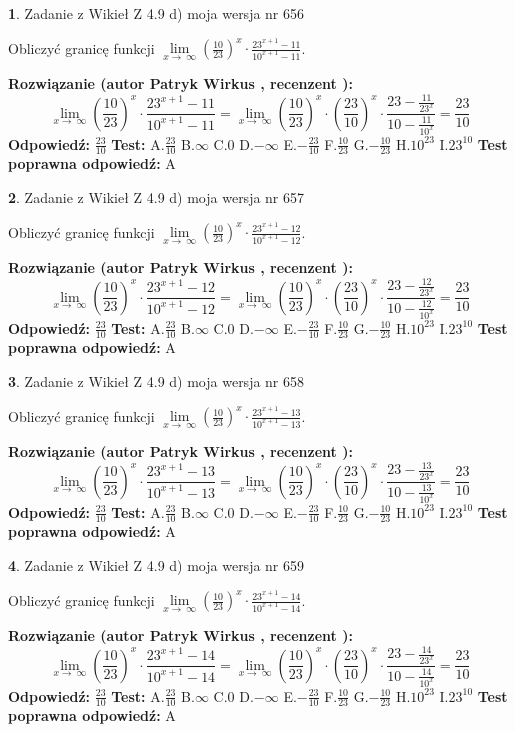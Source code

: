 \documentclass[12pt, a4paper]{article}
\theoremstyle{definition} %
\newtheorem{zad}{}
\newcommand{\zadStart}[1]{\begin{zad}#1\newline}
\newcommand{\zadStop}{\end{zad}}
\newcommand{\rozwStart}[2]{\noindent \textbf{Rozwiązanie (autor #1 , recenzent #2): }\newline}
\newcommand{\rozwStop}{\newline}
\newcommand{\odpStart}{\noindent \textbf{Odpowiedź:}\newline}
\newcommand{\odpStop}{\newline}
\newcommand{\testStart}{\noindent \textbf{Test:}\newline}
\newcommand{\testStop}{\newline}
\newcommand{\kluczStart}{\noindent \textbf{Test poprawna odpowiedź:}\newline}
\newcommand{\kluczStop}{\newline}
\begin{document}
\zadStart{Zadanie z Wikieł Z 4.9 d) moja wersja nr 656}


Obliczyć granicę funkcji  $\lim\limits_{x\to\ \infty}(\frac{10}{23})^{x}\cdot\frac{23^{x+1}-11}{10^{x+1}-11}$.
\zadStop
\rozwStart{Patryk Wirkus}{}
$$\lim\limits_{x\to\ \infty}(\frac{10}{23})^{x}\cdot\frac{23^{x+1}-11}{10^{x+1}-11}=\lim\limits_{x\to\ \infty}(\frac{10}{23})^{x}\cdot(\frac{23}{10})^{x} \cdot \frac{23-\frac{11}{23^{x}}}{10-\frac{11}{10^{x}}} = \frac{23}{10}$$
\rozwStop
\odpStart
$\frac{23}{10}$
\odpStop
\testStart
A.$\frac{23}{10}$ B.$\infty$ C.$0$ D.$-\infty$ E.$-\frac{23}{10}$
F.$\frac{10}{23}$ G.$-\frac{10}{23}$
H.$10^{23}$
I.$23^{10}$
\testStop
\kluczStart
A
\kluczStop



\zadStart{Zadanie z Wikieł Z 4.9 d) moja wersja nr 657}


Obliczyć granicę funkcji  $\lim\limits_{x\to\ \infty}(\frac{10}{23})^{x}\cdot\frac{23^{x+1}-12}{10^{x+1}-12}$.
\zadStop
\rozwStart{Patryk Wirkus}{}
$$\lim\limits_{x\to\ \infty}(\frac{10}{23})^{x}\cdot\frac{23^{x+1}-12}{10^{x+1}-12}=\lim\limits_{x\to\ \infty}(\frac{10}{23})^{x}\cdot(\frac{23}{10})^{x} \cdot \frac{23-\frac{12}{23^{x}}}{10-\frac{12}{10^{x}}} = \frac{23}{10}$$
\rozwStop
\odpStart
$\frac{23}{10}$
\odpStop
\testStart
A.$\frac{23}{10}$ B.$\infty$ C.$0$ D.$-\infty$ E.$-\frac{23}{10}$
F.$\frac{10}{23}$ G.$-\frac{10}{23}$
H.$10^{23}$
I.$23^{10}$
\testStop
\kluczStart
A
\kluczStop



\zadStart{Zadanie z Wikieł Z 4.9 d) moja wersja nr 658}


Obliczyć granicę funkcji  $\lim\limits_{x\to\ \infty}(\frac{10}{23})^{x}\cdot\frac{23^{x+1}-13}{10^{x+1}-13}$.
\zadStop
\rozwStart{Patryk Wirkus}{}
$$\lim\limits_{x\to\ \infty}(\frac{10}{23})^{x}\cdot\frac{23^{x+1}-13}{10^{x+1}-13}=\lim\limits_{x\to\ \infty}(\frac{10}{23})^{x}\cdot(\frac{23}{10})^{x} \cdot \frac{23-\frac{13}{23^{x}}}{10-\frac{13}{10^{x}}} = \frac{23}{10}$$
\rozwStop
\odpStart
$\frac{23}{10}$
\odpStop
\testStart
A.$\frac{23}{10}$ B.$\infty$ C.$0$ D.$-\infty$ E.$-\frac{23}{10}$
F.$\frac{10}{23}$ G.$-\frac{10}{23}$
H.$10^{23}$
I.$23^{10}$
\testStop
\kluczStart
A
\kluczStop



\zadStart{Zadanie z Wikieł Z 4.9 d) moja wersja nr 659}


Obliczyć granicę funkcji  $\lim\limits_{x\to\ \infty}(\frac{10}{23})^{x}\cdot\frac{23^{x+1}-14}{10^{x+1}-14}$.
\zadStop
\rozwStart{Patryk Wirkus}{}
$$\lim\limits_{x\to\ \infty}(\frac{10}{23})^{x}\cdot\frac{23^{x+1}-14}{10^{x+1}-14}=\lim\limits_{x\to\ \infty}(\frac{10}{23})^{x}\cdot(\frac{23}{10})^{x} \cdot \frac{23-\frac{14}{23^{x}}}{10-\frac{14}{10^{x}}} = \frac{23}{10}$$
\rozwStop
\odpStart
$\frac{23}{10}$
\odpStop
\testStart
A.$\frac{23}{10}$ B.$\infty$ C.$0$ D.$-\infty$ E.$-\frac{23}{10}$
F.$\frac{10}{23}$ G.$-\frac{10}{23}$
H.$10^{23}$
I.$23^{10}$
\testStop
\kluczStart
A
\kluczStop
\end{document}
